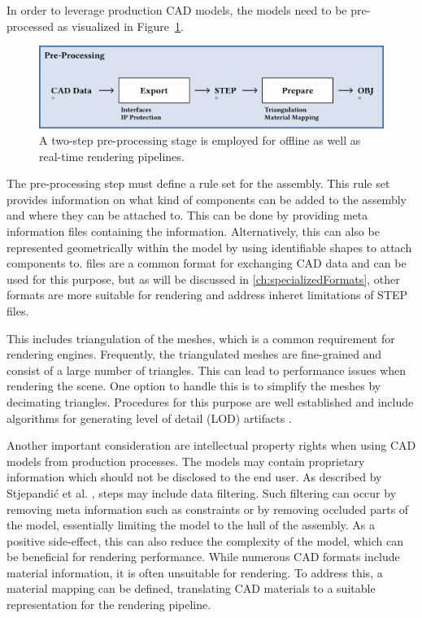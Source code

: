 In order to leverage production \gls{CAD} models, the models need to be pre-processed as visualized in Figure~\ref{fig:cad-preprocessing}. 

\begin{figure}[H]
  \centering
  \includegraphics[width=0.9\columnwidth]{resources/cad-pipeline-preprocessing.png}
  \caption{A two-step pre-processing stage is employed for offline as well as real-time rendering pipelines.}
  \label{fig:cad-preprocessing}
\end{figure}

The pre-processing step must define a rule set for the assembly. This rule set provides information on what kind of components can be added to the assembly and where they can be attached to. This can be done by providing meta information files containing the information. Alternatively, this can also be represented geometrically within the model by using identifiable shapes to attach components to.  files are a common format for exchanging \gls{CAD} data and can be used for this purpose, but as will be discussed in \autoref{ch:specializedFormats}, other formats are more suitable for rendering and address inheret limitations of \gls{STEP} files.

This includes triangulation of the meshes, which is a common requirement for rendering engines. Frequently, the triangulated meshes are fine-grained and consist of a large number of triangles. This can lead to performance issues when rendering the scene. One option to handle this is to simplify the meshes by decimating triangles. Procedures for this purpose are well established and include algorithms for generating level of detail (\gls{LOD}) artifacts \cite{luebke2003level}.

Another important consideration are intellectual property rights when using \gls{CAD} models from production processes. The models may contain proprietary information which should not be disclosed to the end user. As described by Stjepandić et al. \cite{ipr}, steps may include data filtering. Such filtering can occur by removing meta information such as constraints or by removing occluded parts of the model, essentially limiting the model to the hull of the assembly. As a positive side-effect, this can also reduce the complexity of the model, which can be beneficial for rendering performance.
While numerous \gls{CAD} formats include material information, it is often unsuitable for rendering. To address this, a material mapping can be defined, translating \gls{CAD} materials to a suitable representation for the rendering pipeline.

